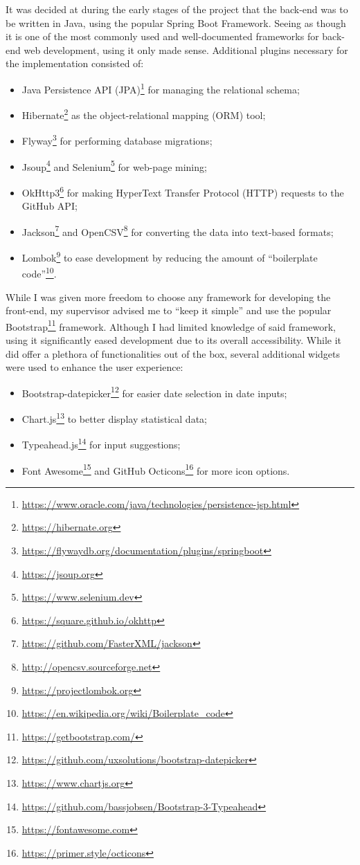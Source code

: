 It was decided at during the early stages of the project that the back-end was to be written in Java, using the popular Spring Boot Framework.
Seeing as though it is one of the most commonly used and well-documented frameworks for back-end web development, using it only made sense.
Additional plugins necessary for the implementation consisted of:
\begin{itemize}
    \item Java Persistence API (JPA)\footnote{\url{https://www.oracle.com/java/technologies/persistence-jsp.html}} for managing the relational schema;
    \item Hibernate\footnote{\url{https://hibernate.org}} as the object-relational mapping (ORM) tool;
    \item Flyway\footnote{\url{https://flywaydb.org/documentation/plugins/springboot}} for performing database migrations;
    \item Jsoup\footnote{\url{https://jsoup.org}} and Selenium\footnote{\url{https://www.selenium.dev}} for web-page mining;
    \item OkHttp3\footnote{\url{https://square.github.io/okhttp}} for making HyperText Transfer Protocol (HTTP) requests to the GitHub API;
    \item Jackson\footnote{\url{https://github.com/FasterXML/jackson}} and OpenCSV\footnote{\url{http://opencsv.sourceforge.net}} for converting the data into text-based formats;
    \item Lombok\footnote{\url{https://projectlombok.org}} to ease development by reducing the amount of ``boilerplate code''\footnote{\url{https://en.wikipedia.org/wiki/Boilerplate_code}}.
\end{itemize}

While I was given more freedom to choose any framework for developing the front-end, my supervisor advised me to ``keep it simple'' and use the popular Bootstrap\footnote{\url{https://getbootstrap.com/}} framework.
Although I had limited knowledge of said framework, using it significantly eased development due to its overall accessibility.
While it did offer a plethora of functionalities out of the box, several additional widgets were used to enhance the user experience:
\begin{itemize}
    \item Bootstrap-datepicker\footnote{\url{https://github.com/uxsolutions/bootstrap-datepicker}} for easier date selection in date inputs;
    \item Chart.js\footnote{\url{https://www.chartjs.org}} to better display statistical data;
    \item Typeahead.js\footnote{\url{https://github.com/bassjobsen/Bootstrap-3-Typeahead}} for input suggestions;
    \item Font Awesome\footnote{\url{https://fontawesome.com}} and GitHub Octicons\footnote{\url{https://primer.style/octicons}} for more icon options.
\end{itemize}

